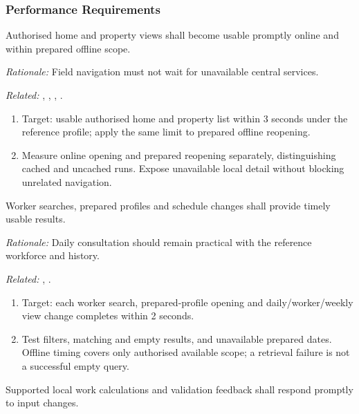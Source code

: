 \subsubsection{Performance Requirements}
\label{nfr:PERF-01}
Authorised home and property views shall become usable promptly online and within prepared offline scope.

\textit{Rationale:} Field navigation must not wait for unavailable central services.

\textit{Related:} \hyperref[fr:002]{}, \hyperref[fr:011]{}, \hyperref[fr:015]{}, \hyperref[fr:023]{}.
\begin{enumerate}[label=(\alph*),leftmargin=*,itemsep=1pt,topsep=3pt]
\item Target: usable authorised home and property list within 3 seconds under the reference profile; apply the same limit to prepared offline reopening.
\item Measure online opening and prepared reopening separately, distinguishing cached and uncached runs. Expose unavailable local detail without blocking unrelated navigation.
\end{enumerate}

\label{nfr:PERF-02}
Worker searches, prepared profiles and schedule changes shall provide timely usable results.

\textit{Rationale:} Daily consultation should remain practical with the reference workforce and history.

\textit{Related:} \hyperref[fr:023]{}, \hyperref[fr:028]{}.
\begin{enumerate}[label=(\alph*),leftmargin=*,itemsep=1pt,topsep=3pt]
\item Target: each worker search, prepared-profile opening and daily/worker/weekly view change completes within 2 seconds.
\item Test filters, matching and empty results, and unavailable prepared dates. Offline timing covers only authorised available scope; a retrieval failure is not a successful empty query.
\end{enumerate}

\label{nfr:PERF-03}
Supported local work calculations and validation feedback shall respond promptly to input changes.

